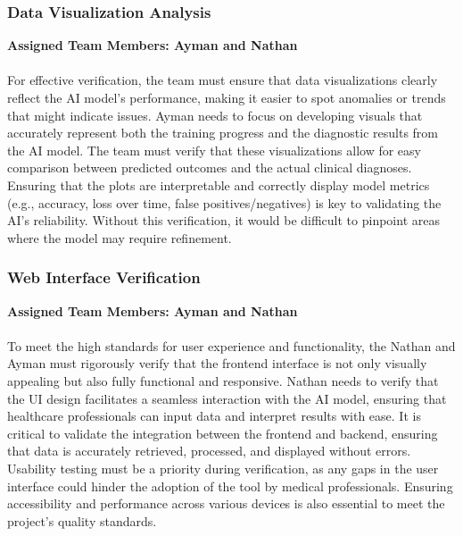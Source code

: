\documentclass[12pt, titlepage]{article}
\begin{document}
\subsubsection{Data Visualization Analysis}
\textbf{Assigned Team Members: Ayman and Nathan}\\\\ 
For effective verification, the team must ensure that data visualizations clearly reflect the AI model’s performance, making it easier to spot anomalies or trends that might indicate issues. Ayman needs to focus on developing visuals that accurately represent both the training progress and the diagnostic results from the AI model. The team must verify that these visualizations allow for easy comparison between predicted outcomes and the actual clinical diagnoses. Ensuring that the plots are interpretable and correctly display model metrics (e.g., accuracy, loss over time, false positives/negatives) is key to validating the AI’s reliability. Without this verification, it would be difficult to pinpoint areas where the model may require refinement.


\subsubsection{Web Interface Verification}
\textbf{Assigned Team Members: Ayman and Nathan} \\\\
To meet the high standards for user experience and functionality, the Nathan and Ayman must rigorously verify that the frontend interface is not only visually appealing but also fully functional and responsive. Nathan needs to verify that the UI design facilitates a seamless interaction with the AI model, ensuring that healthcare professionals can input data and interpret results with ease. It is critical to validate the integration between the frontend and backend, ensuring that data is accurately retrieved, processed, and displayed without errors. Usability testing must be a priority during verification, as any gaps in the user interface could hinder the adoption of the tool by medical professionals. Ensuring accessibility and performance across various devices is also essential to meet the project’s quality standards.
\end{document}

